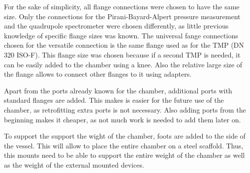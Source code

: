 For the sake of simplicity, all flange connections were chosen to have the same size.
Only the connections for the Pirani-Bayard-Alpert pressure measurement and the quadrupole spectrometer were chosen differently, as little previous knowledge of specific flange sizes was known.
The universal fange connections chosen for the versatile connection is the same flange used as for the TMP (DN 320 ISO-F).
This flange size was chosen because if a second TMP is needed, it can be easily added to the chamber using a knee.
Also the relative large size of the flange allows to connect other flanges to it using adapters.

Apart from the ports already known for the chamber, additional ports with standard flanges are added.
This makes is easier for the future use of the chamber, as retrofitting extra ports is not necessary.
Also adding ports from the beginning makes it cheaper, as not much work is needed to add them later on.

To support the support the wight of the chamber, foots are added to the side of the vessel.
This will allow to place the entire chamber on a steel scaffold.
Thus, this mounts need to be able to support the entire weight of the chamber as well as the weight of the external mounted devices.

